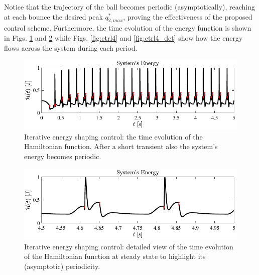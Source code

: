 %
%
Notice that the trajectory of the ball becomes periodic (asymptotically), reaching at each bounce the desired peak $q_{2,max}^*$, proving the effectiveness of the proposed control scheme. Furthermore, the time evolution of the energy function is shown in Figs. \ref{fig:ctrl3} and \ref{fig:ctrl3_det} while Figs. \ref{fig:ctrl4} and \ref{fig:ctrl4_det} show how the energy flows across the system during each period. 
%
\begin{figure}[!ht]
	\centering
	\includegraphics[width=\linewidth]{Figures/ctrl3.pdf}
	\caption{Iterative energy shaping control: the time evolution of the Hamiltonian function. After a short transient also the system's energy becomes periodic.}
	\label{fig:ctrl3}
\end{figure}
%
\begin{figure}[!ht]
	\centering
	\includegraphics[width=\linewidth]{Figures/ctrl3_det.pdf}
	\caption{Iterative energy shaping control: detailed view of the time evolution of the Hamiltonian function at steady state to highlight its (asymptotic) periodicity.}
	\label{fig:ctrl3_det}
\end{figure}
%
